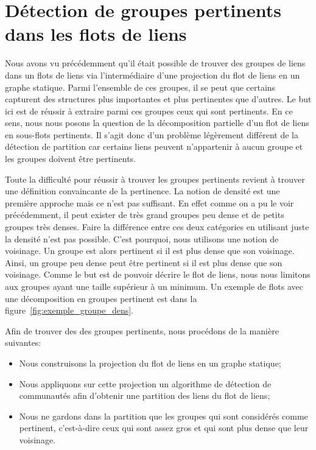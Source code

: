 \chapter{Détection de groupes pertinents dans les flots de liens}
\minitoc
Nous avons vu précédemment qu'il était possible de trouver des groupes de liens dans un flots de liens via l'intermédiaire d'une projection du flot de liens en un graphe statique.
Parmi l'ensemble de ces groupes, il se peut que certains capturent des structures plus importantes et plus pertinentes que d'autres.
Le but ici est de réussir à extraire parmi ces groupes ceux qui sont pertinents.
En ce sens, nous nous posons la question de la décomposition partielle d'un flot de liens en sous-flots pertinents.
Il s'agit donc d'un problème légèrement différent de la détection de partition car certains liens peuvent n'appartenir à aucun groupe et les groupes doivent être pertinents.

Toute la difficulté pour réussir à trouver les groupes pertinents revient à trouver une définition convaincante de la pertinence.
La notion de densité est une première approche mais ce n'est pas suffisant.
En effet comme on a pu le voir précédemment, il peut exister de très grand groupes peu dense et de petits groupes très denses.
Faire la différence entre ces deux catégories en utilisant juste la densité n'est pas possible.
C'est pourquoi, nous utilisons une notion de voisinage.
Un groupe est alors pertinent si il est plus dense que son voisinage.
Ainsi, un groupe peu dense peut être pertinent si il est plus dense que son voisinage.
Comme le but est de pouvoir décrire le flot de liens, nous nous limitons aux groupes ayant une taille supérieur à un minimum.
Un exemple de flots avec une décomposition en groupes pertinent est dans la figure~\ref{fig:exemple_groupe_dens}.

Afin de trouver des des groupes pertinents, nous procédons de la manière suivantes:
\begin{itemize}
\item Nous construisons la projection du flot de liens en un graphe statique;
\item Nous appliquons sur cette projection un algorithme de détection de communautés afin d'obtenir une partition des liens du flot de liens;
\item Nous ne gardons dans la partition que les groupes qui sont considérés comme pertinent, c'est-à-dire ceux qui sont assez gros et qui sont plus dense que leur voisinage.
\end{itemize}

